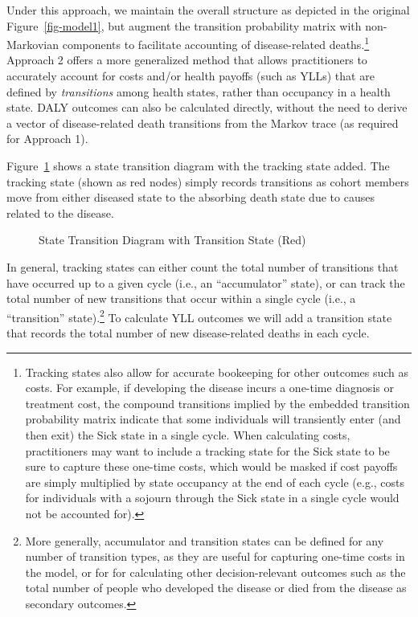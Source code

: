 \documentclass[
]{agujournal2019}
\begin{document}
Under this approach, we maintain the overall structure as depicted in
the original Figure~\ref{fig-model1}, but augment the transition
probability matrix with non-Markovian components to facilitate
accounting of disease-related deaths.\footnote{Tracking states also
  allow for accurate bookeeping for other outcomes such as costs. For
  example, if developing the disease incurs a one-time diagnosis or
  treatment cost, the compound transitions implied by the embedded
  transition probability matrix indicate that some individuals will
  transiently enter (and then exit) the Sick state in a single cycle.
  When calculating costs, practitioners may want to include a tracking
  state for the Sick state to be sure to capture these one-time costs,
  which would be masked if cost payoffs are simply multiplied by state
  occupancy at the end of each cycle (e.g., costs for individuals with a
  sojourn through the Sick state in a single cycle would not be
  accounted for).} Approach 2 offers a more generalized method that
allows practitioners to accurately account for costs and/or health
payoffs (such as YLLs) that are defined by \emph{transitions} among
health states, rather than occupancy in a health state. DALY outcomes
can also be calculated directly, without the need to derive a vector of
disease-related death transitions from the Markov trace (as required for
Approach 1).

Figure~\ref{fig-transition} shows a state transition diagram with the
tracking state added. The tracking state (shown as red nodes) simply
records transitions as cohort members move from either diseased state to
the absorbing death state due to causes related to the disease.

\begin{figure}


\caption{\label{fig-transition}State Transition Diagram with Transition
State (Red)}

\end{figure}%

In general, tracking states can either count the total number of
transitions that have occurred up to a given cycle (i.e., an
``accumulator'' state), or can track the total number of new transitions
that occur within a single cycle (i.e., a ``transition''
state).\footnote{More generally, accumulator and transition states can
  be defined for any number of transition types, as they are useful for
  capturing one-time costs in the model, or for for calculating other
  decision-relevant outcomes such as the total number of people who
  developed the disease or died from the disease as secondary outcomes.}
To calculate YLL outcomes we will add a transition state that records
the total number of new disease-related deaths in each cycle.
\end{document}
